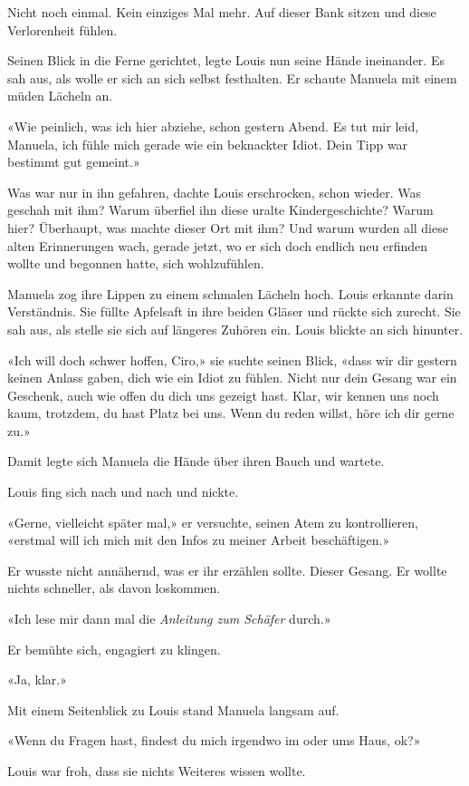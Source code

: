 Nicht noch einmal. Kein einziges Mal mehr. Auf dieser Bank sitzen und
diese Verlorenheit fühlen.

Seinen Blick in die Ferne gerichtet, legte Louis nun seine Hände
ineinander. Es sah aus, als wolle er sich an sich selbst festhalten. Er
schaute Manuela mit einem müden Lächeln an.

«Wie peinlich, was ich hier abziehe, schon gestern Abend. Es tut mir
leid, Manuela, ich fühle mich gerade wie ein beknackter Idiot. Dein Tipp
war bestimmt gut gemeint.»

Was war nur in ihn gefahren, dachte Louis erschrocken, schon wieder. Was
geschah mit ihm? Warum überfiel ihn diese uralte Kindergeschichte? Warum
hier? Überhaupt, was machte dieser Ort mit ihm? Und warum wurden all
diese alten Erinnerungen wach, gerade jetzt, wo er sich doch endlich neu
erfinden wollte und begonnen hatte, sich wohlzufühlen.

Manuela zog ihre Lippen zu einem schmalen Lächeln hoch. Louis erkannte
darin Verständnis. Sie füllte Apfelsaft in ihre beiden Gläser und rückte
sich zurecht. Sie sah aus, als stelle sie sich auf längeres Zuhören ein.
Louis blickte an sich hinunter.

«Ich will doch schwer hoffen, Ciro,» sie suchte seinen Blick, «dass wir
dir gestern keinen Anlass gaben, dich wie ein Idiot zu fühlen. Nicht nur
dein Gesang war ein Geschenk, auch wie offen du dich uns gezeigt hast.
Klar, wir kennen uns noch kaum, trotzdem, du hast Platz bei uns. Wenn du
reden willst, höre ich dir gerne zu.»

Damit legte sich Manuela die Hände über ihren Bauch und wartete.

Louis fing sich nach und nach und nickte.

«Gerne, vielleicht später mal,» er versuchte, seinen Atem zu
kontrollieren, «erstmal will ich mich mit den Infos zu meiner Arbeit
beschäftigen.»

Er wusste nicht annähernd, was er ihr erzählen sollte. Dieser Gesang. Er
wollte nichts schneller, als davon loskommen.

«Ich lese mir dann mal die \emph{Anleitung zum Schäfer} durch.»

Er bemühte sich, engagiert zu klingen.

«Ja, klar.»

Mit einem Seitenblick zu Louis stand Manuela langsam auf.

«Wenn du Fragen hast, findest du mich irgendwo im oder ums Haus, ok?»

Louis war froh, dass sie nichts Weiteres wissen wollte.

